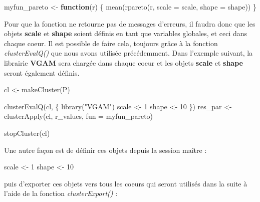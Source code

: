 \documentclass[
]{book}
\newenvironment{Shaded}{\begin{snugshade}}{\end{snugshade}}
\newcommand{\AttributeTok}[1]{\textcolor[rgb]{0.77,0.63,0.00}{#1}}
\newcommand{\ControlFlowTok}[1]{\textcolor[rgb]{0.13,0.29,0.53}{\textbf{#1}}}
\newcommand{\DecValTok}[1]{\textcolor[rgb]{0.00,0.00,0.81}{#1}}
\newcommand{\FunctionTok}[1]{\textcolor[rgb]{0.00,0.00,0.00}{#1}}
\newcommand{\NormalTok}[1]{#1}
\newcommand{\OtherTok}[1]{\textcolor[rgb]{0.56,0.35,0.01}{#1}}
\newcommand{\StringTok}[1]{\textcolor[rgb]{0.31,0.60,0.02}{#1}}
\theoremstyle{definition}
\theoremstyle{definition}
\theoremstyle{definition}
\theoremstyle{definition}
\theoremstyle{remark}
\begin{document}
\begin{Shaded}
\begin{Highlighting}[]
\NormalTok{myfun\_pareto }\OtherTok{\textless{}{-}} \ControlFlowTok{function}\NormalTok{(r) \{}
  \FunctionTok{mean}\NormalTok{(}\FunctionTok{rpareto}\NormalTok{(r, }\AttributeTok{scale =}\NormalTok{ scale, }\AttributeTok{shape =}\NormalTok{ shape))}
\NormalTok{\}}
\end{Highlighting}
\end{Shaded}

Pour que la fonction ne retourne pas de messages d'erreurs, il faudra donc que les objets \textbf{scale} et \textbf{shape} soient définis en tant que variables globales, et ceci dans chaque coeur. Il est possible de faire cela, toujours grâce à la fonction \emph{clusterEvalQ()} que nous avons utilisée précédemment. Dans l'exemple suivant, la librairie \textbf{VGAM} sera chargée dans chaque coeur et les objets \textbf{scale} et \textbf{shape} seront également définis.

\begin{Shaded}
\begin{Highlighting}[]
\NormalTok{cl }\OtherTok{\textless{}{-}} \FunctionTok{makeCluster}\NormalTok{(P) }

\FunctionTok{clusterEvalQ}\NormalTok{(cl, \{}
  \FunctionTok{library}\NormalTok{(}\StringTok{"VGAM"}\NormalTok{)}
\NormalTok{  scale }\OtherTok{\textless{}{-}} \DecValTok{1}
\NormalTok{  shape }\OtherTok{\textless{}{-}} \DecValTok{10}
\NormalTok{  \})}
\NormalTok{res\_par }\OtherTok{\textless{}{-}} \FunctionTok{clusterApply}\NormalTok{(cl, r\_values, }\AttributeTok{fun =}\NormalTok{ myfun\_pareto) }

\FunctionTok{stopCluster}\NormalTok{(cl) }
\end{Highlighting}
\end{Shaded}

Une autre façon est de définir ces objets depuis la session maître :

\begin{Shaded}
\begin{Highlighting}[]
\NormalTok{scale }\OtherTok{\textless{}{-}} \DecValTok{1}
\NormalTok{shape }\OtherTok{\textless{}{-}} \DecValTok{10}
\end{Highlighting}
\end{Shaded}

puis d'exporter ces objets vers tous les coeurs qui seront utilisés dans la suite à l'aide de la fonction \emph{clusterExport()} :
\end{document}
